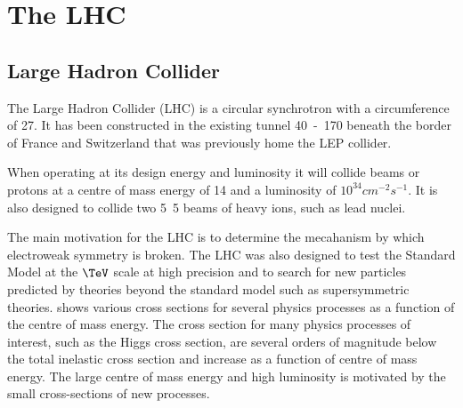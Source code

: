 \chapter{The LHC}
\section{Large Hadron Collider}
The Large Hadron Collider (LHC) is a circular synchrotron with a circumference
of \unit{27}{\kilo\meter}.
It has been constructed in the existing tunnel 
\unit{40-170}{\meter} beneath the border of France and Switzerland
that was previously home the LEP collider.

When operating at its design energy and luminosity it will collide beams or
protons at a centre of mass energy of \unit{14}{\TeV} and a luminosity of $10^34
cm^{-2}s^{-1}$.  
It is also designed to collide two \unit{5.5}{\TeV} beams of heavy ions, such
as lead nuclei.\cite{lhc}

The main motivation for the LHC is to determine the mecahanism by which electroweak
symmetry is broken. 
The LHC was also designed to test the Standard Model at the $\TeV$ scale at high
precision and to search for new particles predicted by theories beyond the standard model such as
supersymmetric theories.
 shows various cross sections for several physics
processes as a function of the centre of mass energy. The cross section for many
physics processes of interest, such as the Higgs cross section, are several
orders of magnitude below the total inelastic cross section and increase as a
function of centre of mass energy. 
The large centre of mass energy and high luminosity is motivated by the
small cross-sections of new processes.

